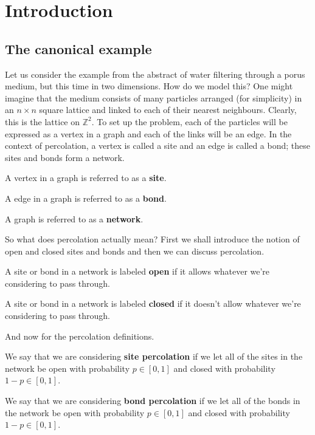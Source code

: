 \section{Introduction}
\subsection{The canonical example}
Let us consider the example from the abstract of water filtering through a porus medium, but this time in two dimensions. How do we model this? One might imagine that the medium consists of
many particles arranged (for simplicity) in an $n \times n$ square lattice and linked to each of their nearest neighbours. Clearly, this is the lattice on $\mathbb{Z}^2$.
To set up the problem, each of the particles will be expressed as a vertex in a graph and each of the links will be an edge. In the context of percolation, a vertex is called a site and an edge is
called a bond; these sites and bonds form a network.

\begin{definition}\label{def:site}
  A vertex in a graph is referred to as a \textbf{site}.
\end{definition}

\begin{definition}\label{def:bond}
  A edge in a graph is referred to as a \textbf{bond}.
\end{definition}

\begin{definition}\label{def:network}
  A graph is referred to as a \textbf{network}.
\end{definition}


So what does percolation actually mean? First we shall introduce the notion of open and closed sites and bonds and then we can discuss percolation.

\begin{definition}\label{def:open}
  A site or bond in a network is labeled \textbf{open} if it allows whatever we're considering to pass through.
\end{definition}

\begin{definition}\label{def:closed}
  A site or bond in a network is labeled \textbf{closed} if it doesn't allow whatever we're considering to pass through.
\end{definition}

And now for the percolation definitions.

\begin{definition}\label{def:sitepercolation}
  We say that we are considering \textbf{site percolation} if we let all of the sites in the network be open with probability $p \in [0, 1]$ and closed with probability $1-p \in [0, 1]$.
\end{definition}
\begin{definition}\label{def:bondpercolation}
  We say that we are considering \textbf{bond percolation} if we let all of the bonds in the network be open with probability $p \in [0, 1]$ and closed with probability $1-p \in [0, 1]$.
\end{definition}

